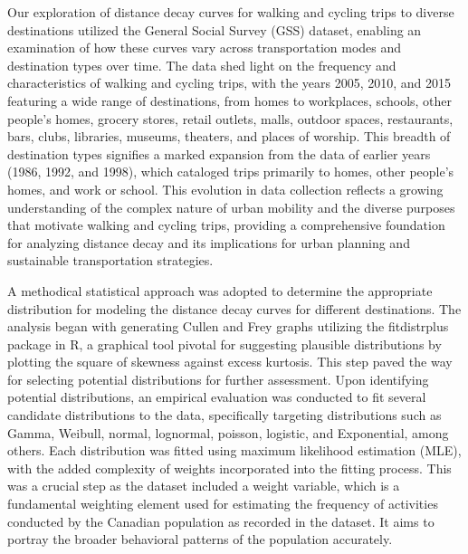 \documentclass[12pt,twoside]{reedthesis}
\begin{document}
Our exploration of distance decay curves for walking and cycling trips to diverse destinations utilized the General Social Survey (GSS) dataset, enabling an examination of how these curves vary across transportation modes and destination types over time. The data shed light on the frequency and characteristics of walking and cycling trips, with the years 2005, 2010, and 2015 featuring a wide range of destinations, from homes to workplaces, schools, other people's homes, grocery stores, retail outlets, malls, outdoor spaces, restaurants, bars, clubs, libraries, museums, theaters, and places of worship. This breadth of destination types signifies a marked expansion from the data of earlier years (1986, 1992, and 1998), which cataloged trips primarily to homes, other people's homes, and work or school. This evolution in data collection reflects a growing understanding of the complex nature of urban mobility and the diverse purposes that motivate walking and cycling trips, providing a comprehensive foundation for analyzing distance decay and its implications for urban planning and sustainable transportation strategies.

A methodical statistical approach was adopted to determine the appropriate distribution for modeling the distance decay curves for different destinations. The analysis began with generating Cullen and Frey graphs utilizing the fitdistrplus package in R, a graphical tool pivotal for suggesting plausible distributions by plotting the square of skewness against excess kurtosis. This step paved the way for selecting potential distributions for further assessment. Upon identifying potential distributions, an empirical evaluation was conducted to fit several candidate distributions to the data, specifically targeting distributions such as Gamma, Weibull, normal, lognormal, poisson, logistic, and Exponential, among others. Each distribution was fitted using maximum likelihood estimation (MLE), with the added complexity of weights incorporated into the fitting process. This was a crucial step as the dataset included a weight variable, which is a fundamental weighting element used for estimating the frequency of activities conducted by the Canadian population as recorded in the dataset. It aims to portray the broader behavioral patterns of the population accurately.
\end{document}
